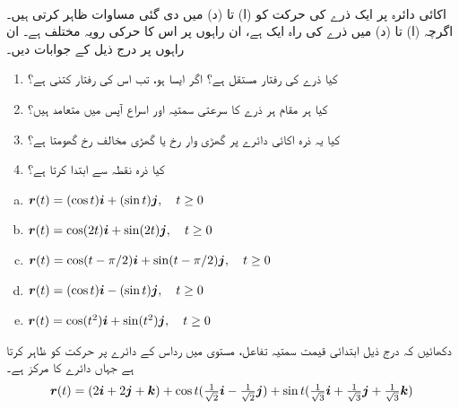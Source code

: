 \\
اکائی دائرہ  پر ایک ذرے  کی   حرکت کو  (ا) تا (د) میں دی گئی  مساوات ظاہر کرتی ہیں۔اگرچہ (ا) تا (د) میں ذرے کی راہ ایک ہے، ان راہوں  پر  اس کا حرکی رویہ مختلف ہے۔ ان  راہوں پر درج ذیل کے جوابات دیں۔
\begin{enumerate}[1.]
\item
کیا ذرے کی رفتار مستقل ہے؟ اگر ایسا ہو، تب اس کی رفتار کتنی ہے؟
\item
کیا ہر مقام ہر ذرے کا سرعتی سمتیہ اور اسراع آپس میں    متعامد ہیں؟
\item
کیا یہ ذرہ اکائی دائرے پر گھڑی وار  رخ   یا   گھڑی مخالف رخ گھومتا ہے؟ 
\item
کیا ذرہ نقطہ  سے ابتدا کرتا ہے؟
\end{enumerate}  
\begin{enumerate}[a.]
\item
${{\boldsymbol{r}}}(t)=(\cos t){\boldsymbol{i}}+(\sin t){\boldsymbol{j}},\quad t\ge 0$
\item
${{\boldsymbol{r}}}(t)=\cos (2t){\boldsymbol{i}}+\sin(2t){\boldsymbol{j}},\quad t\ge 0$
\item
${{\boldsymbol{r}}}(t)=\cos(t-\pi/2){\boldsymbol{i}}+\sin (t-\pi/2){\boldsymbol{j}},\quad t\ge 0$
\item
${{\boldsymbol{r}}}(t)=(\cos t){\boldsymbol{i}}-(\sin t){\boldsymbol{j}},\quad t\ge 0$
\item
${{\boldsymbol{r}}}(t)=\cos(t^2){\boldsymbol{i}}+\sin(t^2){\boldsymbol{j}},\quad t\ge 0$
\end{enumerate}
دکھائیں کہ درج ذیل ابتدائی قیمت سمتیہ تفاعل،  مستوی   میں  رداس  کے دائرے  پر حرکت کو ظاہر کرتا ہے جہاں دائرے کا مرکز  ہے۔
\begin{align*}
{\ensuremath{{\boldsymbol{r}}}}(t)=(2{\boldsymbol{i}}+2{\boldsymbol{j}}+{\boldsymbol{k}})+\cos t(\tfrac{1}{\sqrt{2}}{\boldsymbol{i}}-\tfrac{1}{\sqrt{2}}{\boldsymbol{j}})+\sin t(\tfrac{1}{\sqrt{3}}{\boldsymbol{i}}+\tfrac{1}{\sqrt{3}}{\boldsymbol{j}}+\tfrac{1}{\sqrt{3}}{\boldsymbol{k}})
\end{align*} 

